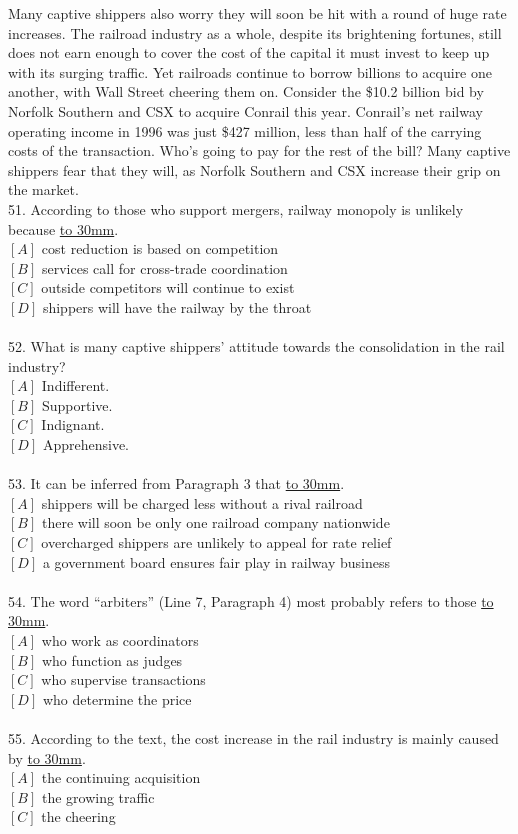 \documentclass[a4paper]{article}
\begin{document}
\par
Many captive shippers also worry they will soon be hit with a round of huge rate increases. The railroad industry as a whole, despite its brightening fortunes, still does not earn enough to cover the cost of the capital it must invest to keep up with its surging traffic. Yet railroads continue to borrow billions to acquire one another, with Wall Street cheering them on. Consider the \$10.2 billion bid by Norfolk Southern and CSX to acquire Conrail this year. Conrail’s net railway operating income in 1996 was just \$427 million, less than half of the carrying costs of the transaction. Who’s going to pay for the rest of the bill? Many captive shippers fear that they will, as Norfolk Southern and CSX increase their grip on the market.
\\51.	According to those who support mergers, railway monopoly is unlikely because \underline{\hbox to 30mm{}}.\\$[A]$ cost reduction is based on competition\\$[B]$ services call for cross-trade coordination\\$[C]$ outside competitors will continue to exist\\$[D]$ shippers will have the railway by the throat\\\\52.	What is many captive shippers’ attitude towards the consolidation in the rail industry?\\$[A]$ Indifferent.\\$[B]$ Supportive.\\$[C]$ Indignant.\\$[D]$ Apprehensive.\\\\53.	It can be inferred from Paragraph 3 that \underline{\hbox to 30mm{}}.\\$[A]$ shippers will be charged less without a rival railroad\\$[B]$ there will soon be only one railroad company nationwide\\$[C]$ overcharged shippers are unlikely to appeal for rate relief\\$[D]$ a government board ensures fair play in railway business\\\\54.	The word “arbiters” (Line 7, Paragraph 4) most probably refers to those \underline{\hbox to 30mm{}}.\\$[A]$ who work as coordinators\\$[B]$ who function as judges\\$[C]$ who supervise transactions\\$[D]$ who determine the price\\\\55.	According to the text, the cost increase in the rail industry is mainly caused by \underline{\hbox to 30mm{}}.\\$[A]$ the continuing acquisition\\$[B]$ the growing traffic\\$[C]$ the cheering 
\end{document}
